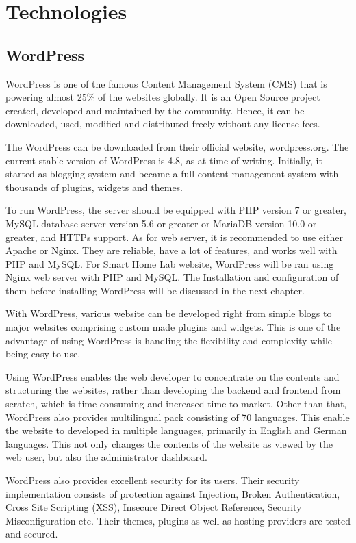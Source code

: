 \chapter{Technologies}
\section{WordPress}
WordPress is one of the famous Content Management System (CMS) that is powering almost 25\% of the websites globally. It is an Open Source project created, developed and maintained by the community. Hence, it can be downloaded, used, modified and distributed freely without any license fees.

The WordPress can be downloaded from their official website, wordpress.org. The current stable version of WordPress is 4.8, as at time of writing. Initially, it started as blogging system and became a full content management system with thousands of plugins, widgets and themes.

To run WordPress, the server should be equipped with PHP version 7 or greater, MySQL database server version 5.6 or greater or MariaDB version 10.0 or greater, and HTTPs support. As for web server, it is recommended to use either Apache or Nginx. They are reliable, have a lot of features, and works well with PHP and MySQL.
For Smart Home Lab website, WordPress will be ran using Nginx web server with PHP and MySQL. The Installation and configuration of them before installing WordPress will be discussed in the next chapter.

With WordPress, various website can be developed right from simple blogs to major websites comprising custom made plugins and widgets. This is one of the advantage of using WordPress is handling the flexibility and complexity while being easy to use.

Using WordPress enables the web developer to concentrate on the contents and structuring the websites, rather than developing the backend and frontend from scratch, which is time consuming and increased time to market.
Other than that, WordPress also provides multilingual pack consisting of 70 languages. This enable the website to developed in multiple languages, primarily in English and German languages. This not only changes the contents of the website as viewed by the web user, but also the administrator dashboard.

WordPress also provides excellent security for its users. Their security implementation consists of protection against Injection, Broken Authentication, Cross Site Scripting (XSS), Insecure Direct Object Reference, Security Misconfiguration etc. Their themes, plugins as well as hosting providers are tested and secured.


